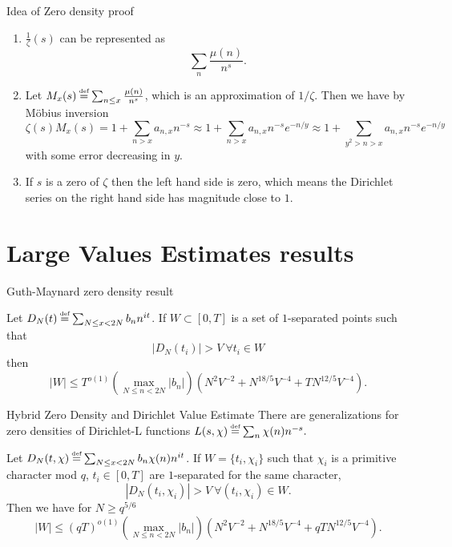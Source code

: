 \documentclass[aspectratio=169,xcolor=dvipsnames]{beamer}
\newcommand\defeq{\mathrel{\stackrel{\makebox[0pt]{\mbox{\normalfont\tiny def}}}{=}}}
\begin{document}
\begin{frame}{Idea of Zero density proof}
    \begin{enumerate}
        \item $\frac{1}{\zeta}(s)$ can be represented as \[
            \sum_{n} \frac{\mu(n)}{n^s}.
        \]
        \item Let $M_x(s)\defeq \sum_{n\leq x}\frac{\mu(n)}{n^s}$, which is an approximation of $1/\zeta$. Then we have by M\"obius inversion \[
        \zeta(s) M_x(s) = 1 + \sum_{n>x}a_{n,x}n^{-s}\approx 1 +\sum_{n>x}a_{n,x}n^{-s}e^{-n/y}\approx 1 +\sum_{y^2>n>x}a_{n,x}n^{-s}e^{-n/y}
        \]
        with some error decreasing in $y$.
        \item If $s$ is a zero of $\zeta$ then the left hand side is zero, which means the Dirichlet series on the right hand side has magnitude close to $1$.
    \end{enumerate}
\end{frame}
\section{Large Values Estimates results}
\begin{frame}{Guth-Maynard zero density result}
    \begin{theorem}
        Let $D_N(t) \defeq \sum_{N\leq x< 2N} b_n n^{i t}$. If $W\subset [0,T]$ is a set of $1$-separated points such that \[
        |D_N(t_i)|>V \ \forall t_i\in W
        \]
         then \[
         |W|\leq T^{o(1)}(\max_{N\leq n <2N} |b_n| )(N^2V^{-2} + N^{18/5}V^{-4}+TN^{12/5}V^{-4}).
         \]
    \end{theorem}

\end{frame}
\begin{frame}{Hybrid Zero Density and Dirichlet Value Estimate}
    There are generalizations for zero densities of Dirichlet-L functions $    L(s,\chi)\defeq\sum_{n} \chi(n)n^{-s}.$
    \begin{theorem}
        Let $D_N(t,\chi) \defeq \sum_{N\leq x< 2N} b_n\chi(n) n^{i t}$. If $W=\{t_i,\chi_i\}$ such that $\chi_i$ is a primitive character mod $q$, $t_i\in [0,T]$ are $1$-separated for the same character, \[
        |D_N(t_i,\chi_i)|>V \ \forall (t_i,\chi_i)\in W.
        \]
         Then we have for $N\geq q^{5/6}$ \[
         |W|\leq (qT)^{o(1)}(\max_{N\leq n <2N} |b_n| )(N^2V^{-2} + N^{18/5}V^{-4}+qTN^{12/5}V^{-4}).
         \]
    \end{theorem}
 
\end{frame}
\end{document}
